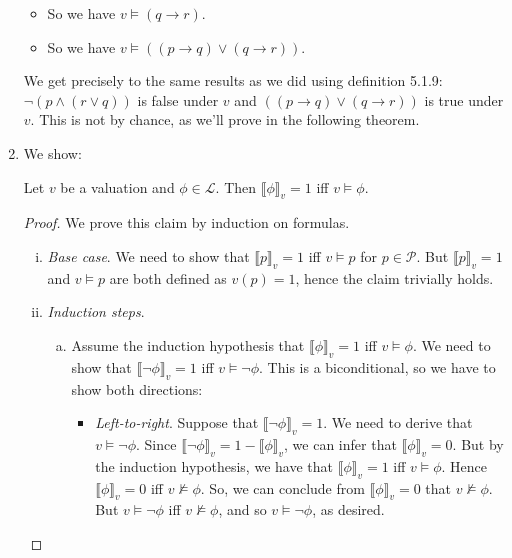 \begin{enumerate}[\thesection.1]
\begin{itemize}
		\item So we have $v\vDash (q\to r)$.
		
		
		\item So we have $v\vDash((p\to q)\lor (q\to r))$.
	
	\end{itemize}
We get precisely to the same results as we did using definition 5.1.9: $\neg (p\land (r\lor q))$ is false under $v$ and $((p\to q)\lor (q\to r))$ is true under $v$. This is not by chance, as we'll prove in the following theorem.

	\item We show:
	
		\begin{proposition}
		Let $v$ be a valuation and $\phi\in\mathcal{L}$. Then $\llbracket\phi\rrbracket_v=1$ iff $v\vDash \phi$.
		\end{proposition}
		\begin{proof}
		We prove this claim by induction on formulas.
		
			\begin{enumerate}[(i)]
			
				\item \emph{Base case}. We need to show that $\llbracket p\rrbracket_v=1$ iff $v\vDash p$ for $p\in \mathcal{P}$. But $\llbracket p\rrbracket_v=1$ and $v\vDash p$ are both defined as $v(p)=1$, hence the claim trivially holds.
				
				\item \emph{Induction steps}. 
				
				\begin{enumerate}[(a)]
				
					\item Assume the induction hypothesis that $\llbracket\phi\rrbracket_v=1$ iff $v\vDash \phi$. We need to show that $\llbracket\neg \phi\rrbracket_v=1$ iff $v\vDash \neg\phi$. This is a biconditional, so we have to show both directions:
					\begin{itemize}
	
						\item \emph{Left-to-right}. Suppose that $\llbracket\neg \phi\rrbracket_v=1$. We need to derive that $v\vDash\neg \phi$. Since $\llbracket\neg \phi\rrbracket_v=1-\llbracket \phi\rrbracket_v$, we can infer that $\llbracket \phi\rrbracket_v=0$. But by the induction hypothesis, we have that $\llbracket\phi\rrbracket_v=1$ iff $v\vDash\phi$. Hence $\llbracket\phi\rrbracket_v=0$ iff $v\nvDash\phi$. So, we can conclude from $\llbracket \phi\rrbracket_v=0$ that $v\nvDash\phi$. But $v\vDash\neg \phi$ iff $v\nvDash\phi$, and so $v\vDash\neg \phi$, as desired.
						

\end{itemize}
\end{enumerate}
\end{enumerate}
\end{proof}
\end{enumerate}
